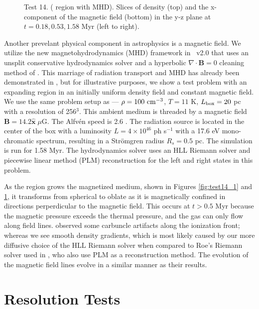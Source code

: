 \documentclass[12pt,preprint]{aastex}
\begin{document}
\begin{figure}[t]
  \caption{\label{fig:test14_2} Test 14. ( region with
    MHD). Slices of density (top) and the x-component of the magnetic
    field (bottom) in the y-z plane at $t = 0.18, 0.53, 1.58$ Myr
    (left to right).}
\end{figure}

Another prevelant physical component in astrophysics is a magnetic
field.  We utilize the new magnetohydrodynamics (MHD) framework
\citep{Wang09} in \enzo~v2.0 that uses an unsplit conservative
hydrodynamics solver and a hyperbolic $\nabla \cdot \mathbf{B} = 0$
cleaning method of \citet{Dedner02}.  This marriage of radiation
transport and MHD has already been demonstrated in \citet{Wang10}, but
for illustrative purposes, we show a test problem with an expanding
 region in an initially uniform density field and constant
magnetic field.  We use the same problem setup as
\citet{Krumholz07_ART} --- $\rho = 100~\cubecm$, $T = 11$ K, $L_{\rm
  box} = 20$ pc with a resolution of 256$^3$.  This ambient medium is
threaded by a magnetic field $\mathbf{B} = 14.2 \hat{\mathbf{x}} \;
\mu\mathrm{G}$.  The Alfv\'{e}n speed is 2.6 \kms.  The radiation
source is located in the center of the box with a luminosity $L = 4
\times 10^{46}$ ph s$^{-1}$ with a 17.6 eV mono-chromatic spectrum,
resulting in a Str\"{o}mgren radius $R_s = 0.5$ pc.  The simulation is
run for 1.58 Myr.  The hydrodynamics solver uses an HLL Riemann solver
\citep{HLL} and piecewise linear method (PLM) reconstruction
\citep{PLM} for the left and right states in this problem.

As the  region grows the magnetized medium, shown in Figures
\ref{fig:test14_1} and \ref{fig:test14_2}, it transforms from
spherical to oblate as it is magnetically confined in directions
perperdicular to the magnetic field.  This occurs at $t > 0.5$ Myr
because the magnetic pressure exceeds the thermal pressure, and the
gas can only flow along field lines.  \citeauthor{Krumholz07_ART}
observed some carbuncle artifacts along the ionization front; whereas
we see smooth density gradients, which is most likely caused by our
more diffusive choice of the HLL Riemann solver when compared to Roe's
Riemann solver used in \citet{Krumholz07_ART}, who also use PLM as a
reconstruction method.  The evolution of the magnetic field lines
evolve in a similar manner as their results.

\section{Resolution Tests}
\end{document}
